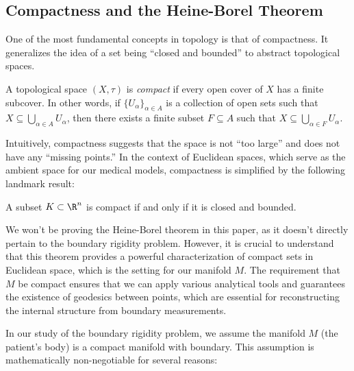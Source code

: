 \subsection{Compactness and the Heine-Borel Theorem} One of the most fundamental concepts in topology is that of compactness. It generalizes the idea of a set being ``closed and bounded'' to abstract topological spaces.

\begin{definition}
  A topological space $(X, \tau)$ is \emph{compact} if every open cover of $X$ has a finite subcover. In other words, if $\{U_\alpha\}_{\alpha \in A}$ is a collection of open sets such that $X \subseteq \bigcup_{\alpha \in A} U_\alpha$, then there exists a finite subset $F \subseteq A$ such that $X \subseteq \bigcup_{\alpha \in F} U_\alpha$.
\end{definition}

Intuitively, compactness suggests that the space is not ``too large'' and does not have any ``missing points.'' In the context of Euclidean spaces, which serve as the ambient space for our medical models, compactness is simplified by the following landmark result:

\begin{theorem}
  A subset $K \subset \R^n$ is compact if and only if it is closed and bounded.
\end{theorem}

\begin{note}
  We won't be proving the Heine-Borel theorem in this paper, as it doesn't directly pertain to the boundary rigidity problem. However, it is crucial to understand that this theorem provides a powerful characterization of compact sets in Euclidean space, which is the setting for our manifold $M$. The requirement that $M$ be compact ensures that we can apply various analytical tools and guarantees the existence of geodesics between points, which are essential for reconstructing the internal structure from boundary measurements.
\end{note}

In our study of the boundary rigidity problem, we assume the manifold $M$ (the patient's body) is a compact manifold with boundary. This assumption is mathematically non-negotiable for several reasons:

